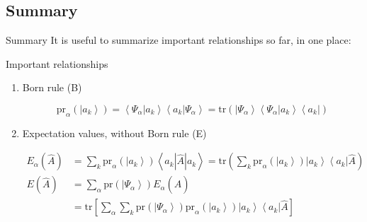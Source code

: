 \documentclass[9pt,handout]{beamer}
\newcommand{\pr}[0]{\text{pr}}
\newcommand{\tr}[0]{\text{tr}}
\begin{document}
\subsection{Summary}
\begin{frame}{Summary}
It is useful to summarize important relationships so far, in one place:

\begin{block}{Important relationships}
\begin{enumerate}
\item Born rule (B)

$$\pr_\alpha \left( \left\lvert a_k \right\rangle \right) = \left\langle \Psi_\alpha \right. \left\lvert a_k \right\rangle \left\langle a_k \right. \left\lvert \Psi_\alpha \right\rangle = \tr \left( \left\lvert \Psi_\alpha \right\rangle \left\langle \Psi_\alpha \right\rvert \left. a_k \right\rangle \left\langle a_k \right\rvert \right)$$

\item Expectation values, without Born rule (E)

\begin{align*}
E_\alpha \left( \widehat{A} \right) & = \sum_{k} \pr_\alpha \left( \left\lvert a_k \right\rangle \right) \left\langle a_k \left\lvert \widehat{A} \right\rvert a_k \right\rangle = \tr \left( \sum_{k} \pr_\alpha \left( \left\lvert a_k \right\rangle \right) \left\lvert a_k \right\rangle \left\langle a_k \right\rvert \widehat{A} \right) \\
E \left( \widehat{A} \right) & = \sum_\alpha \pr \left( \left\lvert \Psi_\alpha \right\rangle \right) E_\alpha \left( \widehat{A} \right) \\
& = \tr \left[ \sum_\alpha \sum_k \pr \left( \left\lvert \Psi_\alpha \right\rangle \right) \pr_\alpha \left( \left\lvert a_k \right\rangle \right) \left\lvert a_k \right\rangle \left\langle a_k \right\rvert \widehat{A} \right]
\end{align*}
\end{enumerate}
\end{block}
\end{frame}
\end{document}
